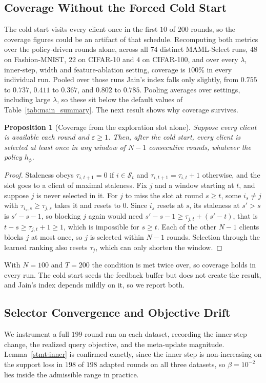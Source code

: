 \documentclass[journal]{IEEEtran}
\newtheorem{proposition}{Proposition}
\theoremstyle{remark}
\newcommand{\revtwo}[1]{#1}
\begin{document}
\subsection{\revtwo{Coverage Without the Forced Cold Start}}\label{sec:fairness_recheck}
\revtwo{The cold start visits every client once in the first $10$ of $200$ rounds, so the coverage figures could be an artifact of that schedule. Recomputing both metrics over the policy-driven rounds alone, across all $74$ distinct MAML-Select runs, $48$ on Fashion-MNIST, $22$ on CIFAR-10 and $4$ on CIFAR-100, and over every $\lambda$, inner-step, width and feature-ablation setting, coverage is $100\%$ in every individual run. Pooled over those runs Jain's index falls only slightly, from $0.755$ to $0.737$, $0.411$ to $0.367$, and $0.802$ to $0.785$. Pooling averages over settings, including large $\lambda$, so these sit below the default values of Table~\ref{tab:main_summary}. The next result shows why coverage survives.}

\begin{proposition}[\revtwo{Coverage from the exploration slot alone}]\label{prop:coverage}
\revtwo{Suppose every client is available each round and $\varepsilon\ge 1$. Then, after the cold start, every client is selected at least once in any window of $N-1$ consecutive rounds, whatever the policy $h_\phi$.}
\end{proposition}
\begin{proof}
\revtwo{Staleness obeys $\tau_{i,t+1}=0$ if $i\in\mathcal{S}_t$ and $\tau_{i,t+1}=\tau_{i,t}+1$ otherwise, and the slot goes to a client of maximal staleness. Fix $j$ and a window starting at $t$, and suppose $j$ is never selected in it. For $j$ to miss the slot at round $s\ge t$, some $i_s\neq j$ with $\tau_{i_s,s}\ge\tau_{j,s}$ takes it and resets to $0$. Since $i_s$ resets at $s$, its staleness at $s'>s$ is $s'-s-1$, so blocking $j$ again would need $s'-s-1\ge\tau_{j,t}+(s'-t)$, that is $t-s\ge\tau_{j,t}+1\ge 1$, which is impossible for $s\ge t$. Each of the other $N-1$ clients blocks $j$ at most once, so $j$ is selected within $N-1$ rounds. Selection through the learned ranking also resets $\tau_j$, which can only shorten the window.}
\end{proof}
\revtwo{With $N=100$ and $T=200$ the condition is met twice over, so coverage holds in every run. The cold start seeds the feedback buffer but does not create the result, and Jain's index depends mildly on it, so we report both.}

\subsection{\revtwo{Selector Convergence and Objective Drift}}\label{sec:selector_convergence}
\revtwo{We instrument a full $199$-round run on each dataset, recording the inner-step change, the realized query objective, and the meta-update magnitude. Lemma~\ref{stmt:inner} is confirmed exactly, since the inner step is non-increasing on the support loss in $198$ of $198$ adapted rounds on all three datasets, so $\beta=10^{-2}$ lies inside the admissible range in practice.}
\end{document}
